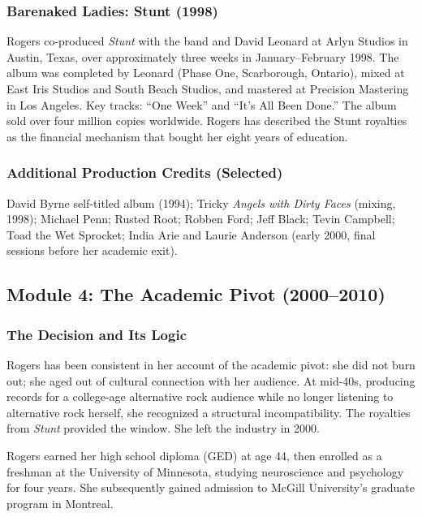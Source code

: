 \documentclass[11pt,letterpaper]{article}
\begin{document}
\subsubsection{Barenaked Ladies: Stunt (1998)}

Rogers co-produced \textit{Stunt} with the band and David Leonard at Arlyn Studios in Austin, Texas, over approximately three weeks in January--February 1998. The album was completed by Leonard (Phase One, Scarborough, Ontario), mixed at East Iris Studios and South Beach Studios, and mastered at Precision Mastering in Los Angeles. Key tracks: ``One Week'' and ``It's All Been Done.'' The album sold over four million copies worldwide. Rogers has described the Stunt royalties as the financial mechanism that bought her eight years of education.

\subsubsection{Additional Production Credits (Selected)}

David Byrne self-titled album (1994); Tricky \textit{Angels with Dirty Faces} (mixing, 1998); Michael Penn; Rusted Root; Robben Ford; Jeff Black; Tevin Campbell; Toad the Wet Sprocket; India Arie and Laurie Anderson (early 2000, final sessions before her academic exit).

\subsection{Module 4: The Academic Pivot (2000--2010)}

\subsubsection{The Decision and Its Logic}

Rogers has been consistent in her account of the academic pivot: she did not burn out; she aged out of cultural connection with her audience. At mid-40s, producing records for a college-age alternative rock audience while no longer listening to alternative rock herself, she recognized a structural incompatibility. The royalties from \textit{Stunt} provided the window. She left the industry in 2000.

Rogers earned her high school diploma (GED) at age 44, then enrolled as a freshman at the University of Minnesota, studying neuroscience and psychology for four years. She subsequently gained admission to McGill University's graduate program in Montreal.
\end{document}
